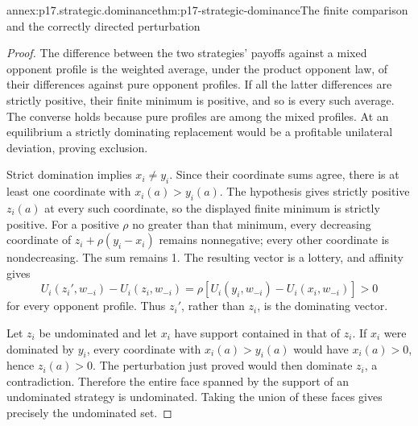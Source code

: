 \begin{annexitem}{annex:p17.strategic.dominance}{thm:p17-strategic-dominance}{The finite comparison and the correctly directed perturbation}
\begin{proof}
The difference between the two strategies'
payoffs against a mixed opponent profile
is the weighted average, under the
product opponent law, of their differences
against pure opponent profiles.
If all the latter differences are strictly
positive, their finite minimum is positive,
and so is every such average.
The converse holds because pure profiles
are among the mixed profiles.
At an equilibrium a strictly dominating
replacement would be a profitable
unilateral deviation, proving exclusion.

Strict domination implies \(x_i\ne y_i\).
Since their coordinate sums agree,
there is at least one coordinate
with \(x_i(a)>y_i(a)\).
The hypothesis gives strictly positive
\(z_i(a)\) at every such coordinate,
so the displayed finite minimum is
strictly positive. For a positive
\(\rho\) no greater than that minimum,
every decreasing coordinate of
\(z_i+\rho(y_i-x_i)\) remains
nonnegative; every other coordinate
is nondecreasing. The sum remains
1. The resulting vector is a
lottery, and affinity gives
\[
 U_i(z_i',w_{-i})-U_i(z_i,w_{-i})
        =\rho[U_i(y_i,w_{-i})-U_i(x_i,w_{-i})]>0
\]
for every opponent profile.
Thus \(z_i'\), rather than \(z_i\),
is the dominating vector.

Let \(z_i\) be undominated and let
\(x_i\) have support contained in
that of \(z_i\).
If \(x_i\) were dominated by \(y_i\),
every coordinate with \(x_i(a)>y_i(a)\)
would have \(x_i(a)>0\), hence
\(z_i(a)>0\). The perturbation just
proved would then dominate \(z_i\),
a contradiction. Therefore the
entire face spanned by the support
of an undominated strategy is
undominated. Taking the union of
these faces gives precisely the
undominated set.
\end{proof}
\end{annexitem}

